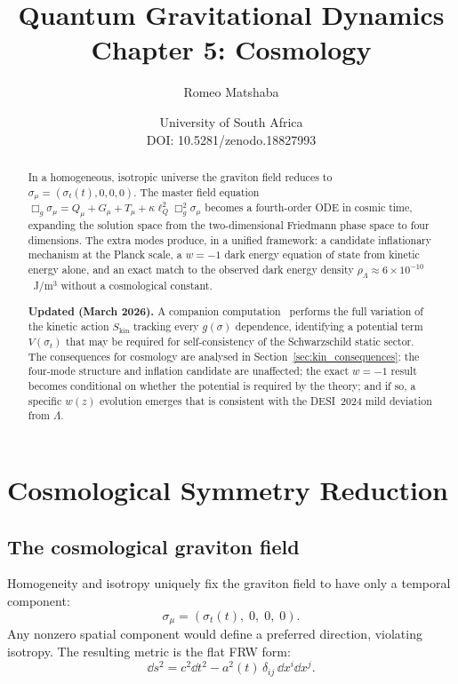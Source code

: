 \documentclass[11pt,a4paper]{article}
\title{\textbf{Quantum Gravitational Dynamics}\\[4pt]
\Large Chapter 5: Cosmology}
\author{Romeo Matshaba}
\date{University of South Africa \\ \small DOI: 10.5281/zenodo.18827993}
\theoremstyle{plain}
\theoremstyle{definition}
\theoremstyle{remark}
\newcommand{\lQ}{\ell_Q}
\begin{document}
\maketitle

\begin{abstract}
In a homogeneous, isotropic universe the graviton field reduces to
$\sigma_\mu = (\sigma_t(t),0,0,0)$.  The master field equation
$\Box_g\sigma_\mu = Q_\mu + G_\mu + T_\mu + \kappa\lQ^2\Box_g^2\sigma_\mu$
becomes a fourth-order ODE in cosmic time, expanding the solution space
from the two-dimensional Friedmann phase space to four dimensions.  The
extra modes produce, in a unified framework: a candidate inflationary
mechanism at the Planck scale, a $w = -1$ dark energy equation of state
from kinetic energy alone, and an exact match to the observed dark energy
density $\rho_\Lambda \approx 6\times10^{-10}$~J/m$^3$ without a
cosmological constant.

\smallskip\noindent\textbf{Updated (March 2026).}  A companion
computation~\cite{matshaba2026:kin_var} performs the full variation of
the kinetic action $S_{\mathrm{kin}}$ tracking every $g(\sigma)$
dependence, identifying a potential term $V(\sigma_t)$ that may be
required for self-consistency of the Schwarzschild static sector.  The
consequences for cosmology are analysed in
Section~\ref{sec:kin_consequences}: the four-mode structure and
inflation candidate are unaffected; the exact $w=-1$ result becomes
conditional on whether the potential is required by the theory; and if
so, a specific $w(z)$ evolution emerges that is consistent with the
DESI~2024 mild deviation from $\Lambda$.
\end{abstract}

\tableofcontents
\newpage

\section{Cosmological Symmetry Reduction}
\label{sec:symmetry}

\subsection{The cosmological graviton field}

Homogeneity and isotropy uniquely fix the graviton field to have only a
temporal component:
\begin{equation}
  \sigma_\mu = (\sigma_t(t),\;0,\;0,\;0).
\end{equation}
Any nonzero spatial component would define a preferred direction, violating
isotropy.  The resulting metric is the flat FRW form:
\begin{equation}
  \dd s^2 = c^2\dd t^2 - a^2(t)\,\delta_{ij}\,\dd x^i\dd x^j.
\end{equation}
\end{document}
